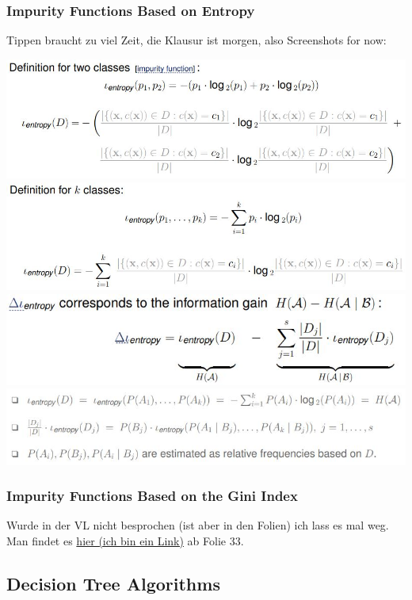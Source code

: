 \documentclass[11pt,a4paper]{article}
\begin{document}
\begin{flushleft}
\subsubsection{Impurity Functions Based on Entropy}
Tippen braucht zu viel Zeit, die Klausur ist morgen, also Screenshots for now:

\includegraphics[width = \textwidth]{impureEntropy2}
\includegraphics[width = \textwidth]{impureEntropyk}
\includegraphics[width = \textwidth]{lentropy}
\includegraphics[width = \textwidth]{lentropy2}

\subsubsection{Impurity Functions Based on the Gini Index}
Wurde in der VL nicht besprochen (ist aber in den Folien) ich lass es mal weg. Man findet es \href{ https://webis.de/downloads/lecturenotes/machine-learning/unit-en-decision-trees-impurity.pdf }{hier (ich bin ein Link)} ab Folie 33.

\subsection{Decision Tree Algorithms}

\end{flushleft}
\end{document}
